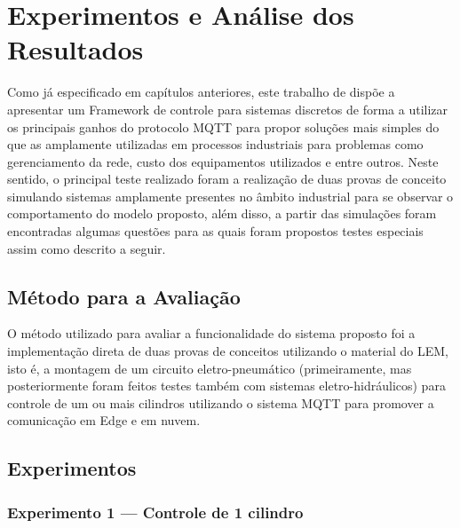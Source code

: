 \newpage
\chapter[Experimentos e Análise dos Resultados]{Experimentos e Análise dos Resultados}
\label{experimentos}

Como já especificado em capítulos anteriores, este trabalho de dispõe a apresentar um Framework de 
 controle para sistemas discretos de forma a utilizar os principais ganhos do protocolo \ac{MQTT} para propor soluções mais 
 simples do que as amplamente utilizadas em processos industriais para problemas como gerenciamento da rede, custo dos 
 equipamentos utilizados e entre outros. Neste sentido, o principal teste realizado foram a realização de duas provas de
 conceito simulando sistemas amplamente presentes no âmbito industrial para se observar o comportamento do modelo 
 proposto, além disso, a partir das simulações foram encontradas algumas questões para as quais foram propostos testes 
 especiais assim como descrito a seguir.

\section{Método para a Avaliação}
\label{metodo}

O método utilizado para avaliar a funcionalidade do sistema proposto foi a implementação direta de duas provas de 
conceitos utilizando o material do \ac{LEM}, isto é, a montagem de um circuito eletro-pneumático 
(primeiramente, mas posteriormente foram feitos testes também com sistemas eletro-hidráulicos) para controle de um ou mais 
cilindros utilizando o sistema \ac{MQTT} para promover a comunicação em Edge e em nuvem.

\section{Experimentos}

\subsection{Experimento 1 — Controle de 1 cilindro}

